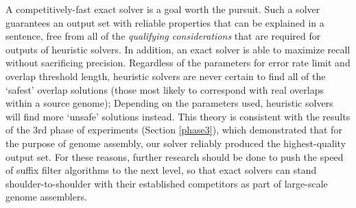 A competitively-fast exact \aspop{} solver is a goal worth the pursuit. Such a solver guarantees an output set with reliable properties that can be explained in a sentence, free from all of the \textit{qualifying considerations} that are required for outputs of heuristic solvers. In addition, an exact solver is able to maximize recall without sacrificing precision. Regardless of the parameters for \gls{error rate} limit and overlap threshold length, heuristic solvers are never certain to find all of the `safest' overlap solutions (those most likely to correspond with real overlaps within a \gls{source genome}); Depending on the parameters used, heuristic solvers will find more `unsafe' solutions instead. This theory is consistent with the results of the 3rd phase of experiments (Section \ref{phase3}), which demonstrated that for the purpose of genome assembly, our solver reliably produced the highest-quality output set. For these reasons, further research should be done to push the speed of suffix filter algorithms to the next level, so that exact solvers can stand shoulder-to-shoulder with their established competitors as part of large-scale genome assemblers.